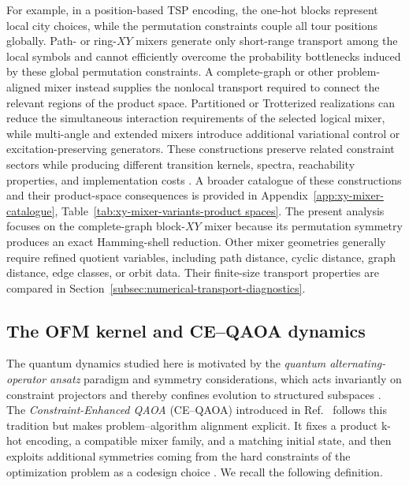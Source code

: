 \documentclass[a4paper,onecolumn,11pt,unpublished]{quantumarticle}
\theoremstyle{remark}
\begin{document}
For example, in a position-based TSP encoding, the one-hot blocks represent local city choices, while the permutation constraints couple all tour positions globally. Path- or ring-\(XY\) mixers generate only short-range transport among the local symbols and cannot efficiently overcome the probability bottlenecks induced by these global permutation constraints. A complete-graph or other problem-aligned mixer instead supplies the nonlocal
transport required to connect the relevant regions of the product space. Partitioned or Trotterized realizations can reduce the simultaneous interaction requirements of the selected logical mixer, while multi-angle and extended mixers introduce additional variational control or excitation-preserving generators. These constructions preserve related constraint sectors while
producing different transition kernels, spectra, reachability properties, and implementation costs
\cite{Hadfield2019AOA,Wang2020XYMixers,He2023A,
KordonowyLeipold2026XYLie,
awasthi2026constraintpreservingxymixerstrotterized,Ruan2025XYCD}. A broader catalogue of these constructions and their product-space consequences is provided in Appendix~\ref{app:xy-mixer-catalogue}, Table~\ref{tab:xy-mixer-variants-product spaces}. The present analysis focuses on the complete-graph block-\(XY\) mixer because its permutation symmetry produces an exact Hamming-shell reduction. Other mixer geometries generally require refined quotient variables, including path distance, cyclic distance, graph distance, edge classes, or orbit data. Their finite-size transport properties are compared in Section~\ref{subsec:numerical-transport-diagnostics}.








\subsection{The OFM kernel and CE--QAOA dynamics}
\label{subsec:ofm-kernel-ceqaoa-dynamics}


The quantum dynamics studied here is motivated by the
\emph{quantum alternating-operator ansatz} paradigm and symmetry considerations, which acts invariantly on constraint projectors and thereby confines evolution to structured subspaces
\cite{Hadfield2019AOA,Hadfield_2022,Fuchs2022ConstrainedMixers,sawaya2023encoding,tsvelikhovskiy2024symmetries}.
The \emph{Constraint-Enhanced QAOA} (CE--QAOA) introduced in
Ref.~\cite{onahce} follows this tradition but makes problem--algorithm alignment explicit. It fixes a product k-hot encoding, a compatible mixer family, and a matching initial state, and then exploits additional symmetries coming from the hard
constraints of the optimization problem as a codesign choice \cite{Li2021CoDesign}. We recall the following definition.
\end{document}
